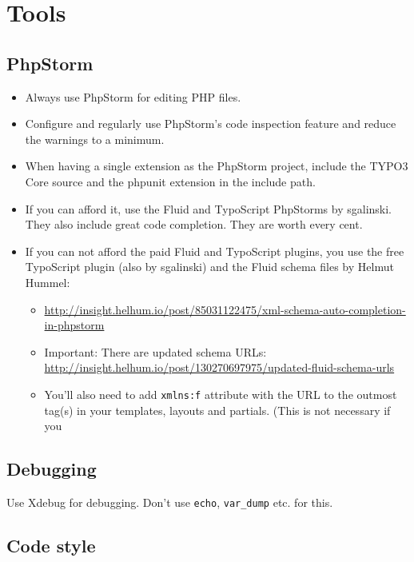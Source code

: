 \chapter{Tools}

\section{PhpStorm}

\begin{itemize}
  \item Always use PhpStorm for editing PHP files.
  \item Configure and regularly use PhpStorm’s code inspection feature and reduce the warnings to a minimum.
  \item When having a single extension as the PhpStorm project, include the TYPO3 Core source and the phpunit extension in the include path.
  \item If you can afford it, use the Fluid and TypoScript PhpStorms by sgalinski. They also include great code completion. They are worth every cent.
  \item If you can not afford the paid Fluid and TypoScript plugins, you use the free TypoScript plugin (also by sgalinski) and the Fluid schema files by Helmut Hummel:
    \begin{itemize}
      \item \url{http://insight.helhum.io/post/85031122475/xml-schema-auto-completion-in-phpstorm}
      \item Important: There are updated schema URLs:\\\url{http://insight.helhum.io/post/130270697975/updated-fluid-schema-urls}
      \item You’ll also need to add \texttt{xmlns:f} attribute with the URL to the outmost tag(s) in your templates, layouts and partials. (This is not necessary if you
    \end{itemize}
\end{itemize}


\section{Debugging}
Use Xdebug for debugging. Don’t use \texttt{echo}, \texttt{var\_dump}  etc. for this.


\section{Code style}

